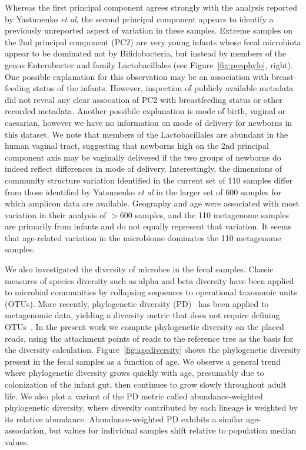 \documentclass[10pt]{article}
\begin{document}
Whereas the first principal component agrees strongly with the analysis reported by Yastunenko \textit{et al}, the second principal component appears to identify a previously unreported aspect of variation in these samples.
Extreme samples on the 2nd principal component (PC2) are very young infants whose fecal microbiota appear to be dominated not by Bifidobacteria, but instead by members of the genus Enterobacter and family Lactobacillales (see Figure~\ref{fig:pcaphylo}, right).
One possible explanation for this observation may be an association with breast-feeding status of the infants.
However, inspection of publicly available metadata did not reveal any clear assocation of PC2 with breastfeeding status or other recorded metadata.
Another possibile explanation is mode of birth, vaginal or caesarian, however we have no information on mode of delivery for newborns in this dataset.
We note that members of the Lactobacillales are abundant in the human vaginal tract, suggesting that newborns high on the 2nd principal component axis may be vaginally delivered if the two groups of newborns do indeed reflect differences in mode of delivery.
Interestingly, the dimensions of community structure variation identified in the current set of 110 samples differ from those identified by Yatsunenko \textit{et al} in the larger set of 600 samples for which amplicon data are available.
Geography and age were associated with most variation in their analysis of $>$600 samples, and the 110 metagenome samples are primarily from infants and do not equally represent that variation.
It seems that age-related variation in the microbiome dominates the 110 metagenome samples.

We also investigated the diversity of microbes in the fecal samples.
Classic measures of species diversity such as alpha and beta diversity have been applied to microbial communities by collapsing sequences to operational taxonomic units (OTUs).
More recently, phylogenetic diversity (PD)~\cite{Faith1992} has been applied to metagenomic data, yielding a diversity metric that does not require defining OTUs~\cite{Kembel2011}.
In the present work we compute phylogenetic diversity on the placed reads, using the attachment points of reads to the reference tree as the basis for the diversity calculation.
Figure~\ref{fig:agediversity} shows the phylogenetic diversity present in the fecal samples as a function of age.
We observe a general trend where phylogenetic diversity grows quickly with age, presumably due to colonization of the infant gut, then continues to grow slowly throughout adult life.
We also plot a variant of the PD metric called abundance-weighted phylogenetic diversity, where diversity contributed by each lineage is weighted by its relative abundance.
Abundance-weighted PD exhibits a similar age-association, but values for individual samples shift relative to population median values.
\end{document}
